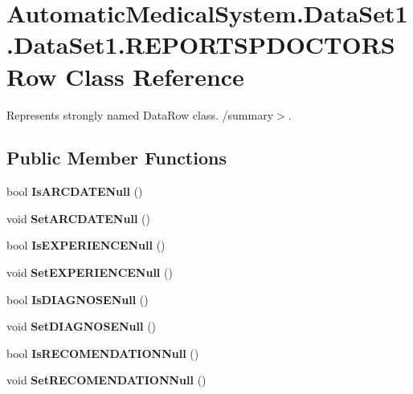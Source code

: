\section{AutomaticMedicalSystem.DataSet1.DataSet1.REPORTSPDOCTORSRow Class Reference}
\label{class_automatic_medical_system_1_1_data_set1_1_1_r_e_p_o_r_t_s_p_d_o_c_t_o_r_s_row}
Represents strongly named DataRow class. /summary$>$.  


\subsection*{Public Member Functions}
\begin{CompactItemize}
\item 
bool \textbf{IsARCDATENull} ()\label{class_automatic_medical_system_1_1_data_set1_1_1_r_e_p_o_r_t_s_p_d_o_c_t_o_r_s_row_c2fbb31e65f5d0797d3848677b8599db}

\item 
void \textbf{SetARCDATENull} ()\label{class_automatic_medical_system_1_1_data_set1_1_1_r_e_p_o_r_t_s_p_d_o_c_t_o_r_s_row_4244c5eada1433ebefccc2c7157047e7}

\item 
bool \textbf{IsEXPERIENCENull} ()\label{class_automatic_medical_system_1_1_data_set1_1_1_r_e_p_o_r_t_s_p_d_o_c_t_o_r_s_row_d74e6f3430da1bc72da318fbae53d75d}

\item 
void \textbf{SetEXPERIENCENull} ()\label{class_automatic_medical_system_1_1_data_set1_1_1_r_e_p_o_r_t_s_p_d_o_c_t_o_r_s_row_649f1c0a37e6230876b8900210a9b40d}

\item 
bool \textbf{IsDIAGNOSENull} ()\label{class_automatic_medical_system_1_1_data_set1_1_1_r_e_p_o_r_t_s_p_d_o_c_t_o_r_s_row_29b74adf71e5ca743224e93c631647fc}

\item 
void \textbf{SetDIAGNOSENull} ()\label{class_automatic_medical_system_1_1_data_set1_1_1_r_e_p_o_r_t_s_p_d_o_c_t_o_r_s_row_555acb3be84b8394ed473187284ac3c1}

\item 
bool \textbf{IsRECOMENDATIONNull} ()\label{class_automatic_medical_system_1_1_data_set1_1_1_r_e_p_o_r_t_s_p_d_o_c_t_o_r_s_row_42336e68352f5c51e5d29b1c6d11ff6f}

\item 
void \textbf{SetRECOMENDATIONNull} ()\label{class_automatic_medical_system_1_1_data_set1_1_1_r_e_p_o_r_t_s_p_d_o_c_t_o_r_s_row_2c7ebf4e26679aa93a9e2b95eeb6e6a6}

\end{CompactItemize}
